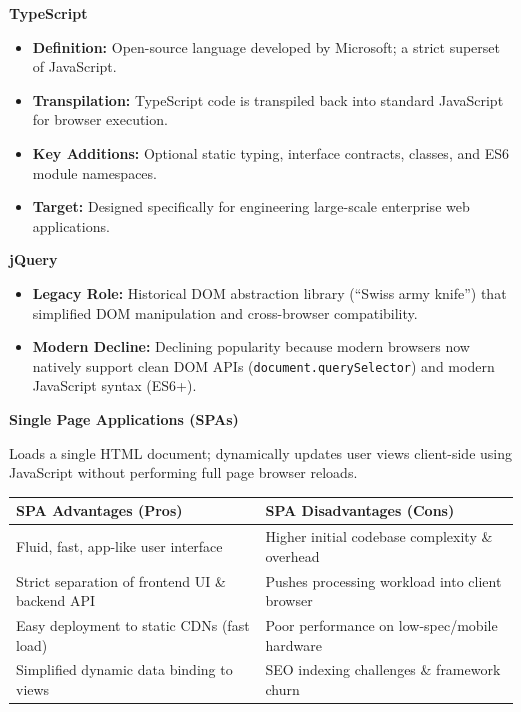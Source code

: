 \documentclass[8pt, a4paper]{article}
\begin{document}
\begin{conceptbox}
\textbf{TypeScript}
\begin{itemize}
  \item \textbf{Definition:} Open-source language developed by Microsoft; a strict superset of JavaScript.
  \item \textbf{Transpilation:} TypeScript code is transpiled back into standard JavaScript for browser execution.
  \item \textbf{Key Additions:} Optional static typing, interface contracts, classes, and ES6 module namespaces.
  \item \textbf{Target:} Designed specifically for engineering large-scale enterprise web applications.
\end{itemize}
\end{conceptbox}

\begin{conceptbox}
\textbf{jQuery}
\begin{itemize}
  \item \textbf{Legacy Role:} Historical DOM abstraction library (``Swiss army knife'') that simplified DOM
        manipulation and cross-browser compatibility.
  \item \textbf{Modern Decline:} Declining popularity because modern browsers now natively support clean DOM
        APIs (\texttt{document.querySelector}) and modern JavaScript syntax (ES6+).
\end{itemize}
\end{conceptbox}

\begin{conceptbox}
\textbf{Single Page Applications (SPAs)}

Loads a single HTML document; dynamically updates user views client-side using JavaScript without performing
full page browser reloads.

\smallskip
\begin{tabularx}{\linewidth}{X X}
  \toprule
  \textbf{SPA Advantages (Pros)} & \textbf{SPA Disadvantages (Cons)} \\
  \midrule
  Fluid, fast, app-like user interface           & Higher initial codebase complexity \& overhead \\
  Strict separation of frontend UI \& backend API & Pushes processing workload into client browser \\
  Easy deployment to static CDNs (fast load)     & Poor performance on low-spec/mobile hardware \\
  Simplified dynamic data binding to views       & SEO indexing challenges \& framework churn \\
  \bottomrule
\end{tabularx}
\end{conceptbox}
\end{document}
